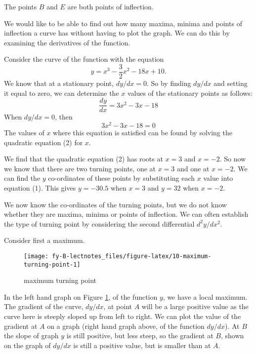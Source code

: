 \documentclass[
  11pt,
  oneside]{book}
\newcommand{\slide}{}
\theoremstyle{definition}
\theoremstyle{definition}
\theoremstyle{definition}
\theoremstyle{definition}
\theoremstyle{remark}
\begin{document}
The points \(B\) and \(E\) are both points of inflection.
\slide

We would like to be able to find out how many maxima, minima and points of inflection a curve has without having to plot the graph. We can do this by examining the derivatives of the function.

Consider the curve of the function with the equation
\[
y = x^3-\frac 32x^2-18x+10.
\]
We know that at a stationary point, \(dy/dx=0\). So by finding \(dy/dx\) and setting it equal to zero, we can determine the \(x\) values of the stationary points as follows:
\[
\frac{dy}{dx} = 3x^2-3x-18\tag{1}
\]
When \(dy/dx = 0\), then
\[
3x^2-3x-18=0\tag{2}
\]
The values of \(x\) where this equation is satisfied can be found by solving the quadratic equation (2) for \(x\).

We find that the quadratic equation (2) has roots at \(x = 3\) and \(x = -2\). So now we know that there are two turning points, one at \(x = 3\) and one at \(x = -2\). We can find the \(y\) co-ordinates of these points by substituting each \(x\) value into equation (1). This gives \(y = -30.5\) when \(x = 3\) and \(y = 32\) when \(x = -2\).

We now know the co-ordinates of the turning points, but we do not know whether they are maxima, minima or points of inflection. We can often establish the type of turning point by considering the second differential \(d^2y/dx^2\).
\slide

Consider first a maximum.

\begin{figure}

{\centering \texttt{[image: fy-B-lectnotes\_files/figure-latex/10-maximum-turning-point-1]} 

}

\caption{maximum turning point}\label{fig:10-maximum-turning-point}
\end{figure}

In the left hand graph on Figure \ref{fig:10-maximum-turning-point}, of the function \(y\), we have a local maximum. The gradient of the curve, \(dy/dx\), at point \(A\) will be a large positive value as the curve here is steeply sloped up from left to right. We can plot the value of the gradient at \(A\) on a graph (right hand graph above, of the function \(dy/dx\)). At \(B\) the slope of graph \(y\) is still positive, but less steep, so the gradient at \(B\), shown on the graph of \(dy/dx\) is still a positive value, but is smaller than at \(A\).
\end{document}
